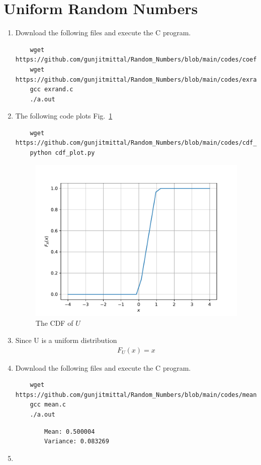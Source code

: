 \documentclass[journal,12pt,twocolumn]{IEEEtran}
\renewcommand\thesection{\arabic{section}}
\begin{document}
\section{Uniform Random Numbers}
\begin{enumerate}[label=\thesection.\arabic*
,ref=\thesection.\theenumi]
    \item \solution{} Download the following files and execute the  C program.
    \begin{lstlisting}
    wget https://github.com/gunjitmittal/Random_Numbers/blob/main/codes/coeffs.h
    wget https://github.com/gunjitmittal/Random_Numbers/blob/main/codes/exrand.c
    gcc exrand.c
    ./a.out
    \end{lstlisting}
    \item \solution{} The following code plots Fig.~\ref{fig:uni_cdf}
    \begin{lstlisting}
    wget https://github.com/gunjitmittal/Random_Numbers/blob/main/codes/cdf_plot.py
    python cdf_plot.py
    \end{lstlisting}
     \begin{figure}[h]
        \centering
        \includegraphics[width=\columnwidth]{../figs/uni_cdf}
        \caption{The CDF of $U$}\label{fig:uni_cdf}
        \end{figure}
    \item \solution{} Since U is  a uniform distribution
    \begin{align}
        F_U(x) = x
    \end{align}
    \item \solution{} Download the following files and execute the  C program.
    \begin{lstlisting}
    wget https://github.com/gunjitmittal/Random_Numbers/blob/main/codes/mean.c
    gcc mean.c
    ./a.out
    \end{lstlisting}
    \begin{lstlisting}
        Mean: 0.500004
        Variance: 0.083269
    \end{lstlisting}
    \item \solution{}
    \end{enumerate}
\end{document}
